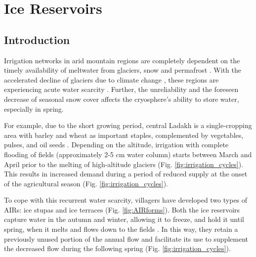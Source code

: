 \chapter{Ice Reservoirs}



\section{Introduction}

Irrigation networks in arid mountain regions are completely dependent on the timely availability
of meltwater from glaciers, snow and permafrost \citep{immerzeelImportanceVulnerabilityWorld2020,
farhanHydrologicalRegimesConjunction2015, tveitenGlacierGrowingLocal2007}. With the accelerated decline of
glaciers due to climate change \citep{nusserLocalKnowledgeGlobal2016}, these regions are experiencing acute
water scarcity \citep{norphelSnowWaterHarvesting2015, mukhopadhyayReevaluationSnowmeltGlacial2015}. Further, the
unreliability and the foreseen decrease of seasonal snow cover \citep{chevuturiClimateChangeLeh2018} affects the cryosphere's ability to store water, especially in spring.

For example, due to the short growing period, central Ladakh is a single-cropping area with barley and wheat as
important staples, complemented by vegetables, pulses, and oil seeds
\citep{nusserSociohydrologyArtificialGlaciers2019}. Depending on the altitude, irrigation with complete
flooding of fields (approximately 2-5 cm water column) starts between March and April prior to the melting of
high-altitude glaciers (Fig. \ref{fig:irrigation_cycles}). This results in increased demand during a period of
reduced supply at the onset of the agricultural season (Fig. \ref{fig:irrigation_cycles}).

To cope with this recurrent water scarcity, villagers have developed two types of \ac{AIRs}: ice stupas
and ice terraces (Fig. \ref{fig:AIRforms}). Both the ice reservoirs capture water in the autumn and winter,
allowing it to freeze, and hold it until spring, when it melts and flows down to the fields
\citep{ipccChapterHighMountain2019, vinceGlacierMan2009, clouseLadakhArtificialGlaciers2017,
nusserSociohydrologyArtificialGlaciers2019}. In this way, they retain a previously unused portion of the annual
flow and facilitate its use to supplement the decreased flow during the following spring (Fig.
\ref{fig:irrigation_cycles}).

